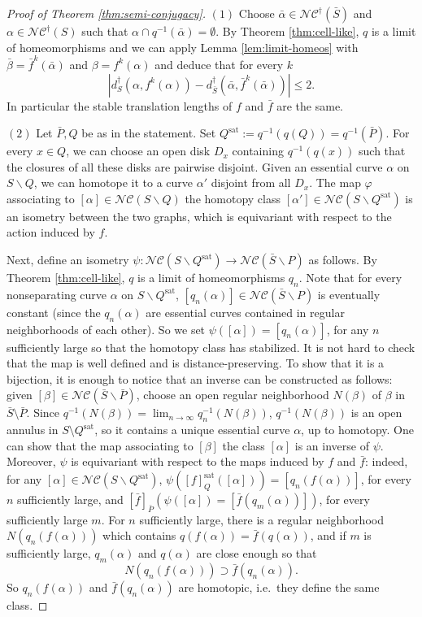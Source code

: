 \documentclass{amsart}
\newcommand{\NC}{\mathcal{NC}}
\newcommand{\NCdagger}{\NC^\dagger}
\newcommand{\ssm}{\smallsetminus}
\newcommand{\distdagger}{d^\dagger}
\newcommand{\sat}[1]{{#1}^{\textrm{sat}}}
\theoremstyle{definition}
\begin{document}
\begin{proof}[Proof of Theorem \ref{thm:semi-conjugacy}]
\((1)\) Choose \(\bar{\alpha}\in\NCdagger(\bar{S})\) and \(\alpha\in\NCdagger(S)\) such that \(\alpha\cap q^{-1}(\bar{\alpha})= \emptyset\). By Theorem \ref{thm:cell-like}, \(q\) is a limit of homeomorphisms and we can apply Lemma \ref{lem:limit-homeos} with \(\bar{\beta}=\bar{f}^k(\bar{\alpha})\) and \(\beta=f^k(\alpha)\) and deduce that for every \(k\)
\[|\distdagger_S(\alpha,f^k(\alpha))-\distdagger_{\bar{S}}(\bar{\alpha}, \bar{f}^k(\bar{\alpha}))|\leq 2.\]
In particular the stable translation lengths of \(f\) and \(\bar{f}\) are the same.

\((2)\) Let $\bar{P}, Q$ be as in the statement. Set \(\sat{Q}:=q^{-1}(q(Q))=q^{-1}(\bar{P})\). For every \(x\in Q\), we can choose an open disk \(D_x\) containing \(q^{-1}(q(x))\) such that the closures of all these disks are pairwise disjoint. Given an essential curve \(\alpha\) on \(S\ssm Q\), we can homotope it to a curve \(\alpha'\) disjoint from all \(D_x\). The map \(\varphi\) associating to \([\alpha]\in\NC(S\ssm Q)\) the homotopy class \([\alpha']\in\NC(S\ssm \sat{Q})\) is an isometry between the two graphs, which is equivariant with respect to the action induced by \(f\).

Next, define an isometry \(\psi:\NC(S\ssm\sat{Q})\to\NC(\bar{S}\ssm P)\) as follows. By Theorem \ref{thm:cell-like}, \(q\) is a limit of homeomorphisms \(q_n\). Note that for every nonseparating curve \(\alpha\) on \(S\ssm\sat{Q}\), \([q_n(\alpha)]\in\NC(\bar{S}\ssm P)\) is eventually constant (since the \(q_n(\alpha)\) are essential curves contained in regular neighborhoods of each other). So we set \(\psi([\alpha])=[q_n(\alpha)]\), for any \(n\) sufficiently large so that the homotopy class has stabilized. It is not hard to check that the map is well defined and is distance-preserving. To show that it is a bijection, it is enough to notice that an inverse can be constructed as follows: given \([\beta]\in\NC(\bar{S}\ssm \bar{P})\), choose an open regular neighborhood \(N(\beta)\) of \(\beta\) in $\bar{S} \setminus \bar{P}$. Since \(q^{-1}(N(\beta))=\lim_{n\to \infty}q_n^{-1}(N(\beta))\), \(q^{-1}(N(\beta))\) is an open annulus in $S \setminus \sat{Q}$, so it contains a unique essential curve \(\alpha\), up to homotopy. One can show that the map associating to \([\beta]\) the class \([\alpha]\) is an inverse of \(\psi\). Moreover, \(\psi\) is equivariant with respect to the maps induced by \(f\) and \(\bar{f}\): indeed, for any \([\alpha]\in\NC(S\ssm \sat{Q})\), \(\psi([f]_\sat{Q}([\alpha]))=[q_n(f(\alpha))]\), for every \(n\) sufficiently large, and \([\bar{f}]_{\bar{P}}(\psi([\alpha])=[\bar{f}(q_m(\alpha))])\), for every sufficiently large \(m\). For \(n\) sufficiently large, there is a regular neighborhood \(N(q_n(f(\alpha)))\) which contains \(q(f(\alpha))=\bar{f}(q(\alpha))\), and if \(m\) is sufficiently large, \(q_m(\alpha)\) and \(q(\alpha)\) are close enough so that \[N(q_n(f(\alpha)))\supset \bar{f}(q_n(\alpha)).\] So \(q_n(f(\alpha))\) and \(\bar{f}(q_n(\alpha))\) are homotopic, i.e.\ they define the same class.


\end{proof}
\end{document}
